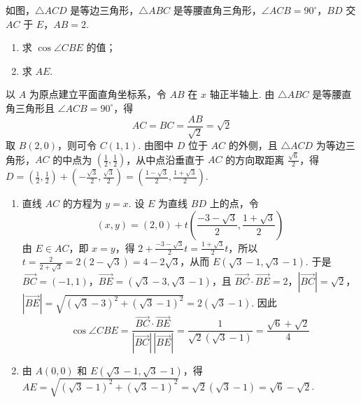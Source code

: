 \begin{problem}
如图，\(\triangle ACD\) 是等边三角形，\(\triangle ABC\) 是等腰直角三角形，\(\angle ACB = 90^{\circ}\)，\(BD\) 交 \(AC\) 于 \(E\)，\(AB = 2\).

\begin{enumerate}
\item 求 \(\cos \angle CBE\) 的值；
\item 求 \(AE\).
\end{enumerate}

\FloatBarrier

\begin{solution}
以 \(A\) 为原点建立平面直角坐标系，令 \(AB\) 在 \(x\) 轴正半轴上. 由 \(\triangle ABC\) 是等腰直角三角形且 \(\angle ACB=90^{\circ}\)，得
\[
AC=BC=\frac{AB}{\sqrt{2}}=\sqrt{2}
\]
取 \(B(2,0)\)，则可令 \(C(1,1)\). 由图中 \(D\) 位于 \(AC\) 的外侧，且 \(\triangle ACD\) 为等边三角形，\(AC\) 的中点为 \(\left(\frac12,\frac12\right)\)，从中点沿垂直于 \(AC\) 的方向取距离 \(\frac{\sqrt{6}}{2}\)，得 \(D=\left(\frac12,\frac12\right)+\left(-\frac{\sqrt{3}}2,\frac{\sqrt{3}}2\right)=\left(\frac{1-\sqrt{3}}2,\frac{1+\sqrt{3}}2\right)\).

\begin{enumerate}
\item 直线 \(AC\) 的方程为 \(y=x\). 设 \(E\) 为直线 \(BD\) 上的点，令
\[
(x,y)=(2,0)+t\left(\frac{-3-\sqrt{3}}{2},\frac{1+\sqrt{3}}{2}\right)
\]
由 \(E\in AC\)，即 \(x=y\)，得 \(2+\frac{-3-\sqrt{3}}2t=\frac{1+\sqrt{3}}2t\)，所以 \(t=\frac{2}{2+\sqrt{3}}=2(2-\sqrt{3})=4-2\sqrt{3}\)，从而 \(E(\sqrt{3}-1,\sqrt{3}-1)\). 于是 \(\overrightarrow{BC}=(-1,1)\)，\(\overrightarrow{BE}=(\sqrt{3}-3,\sqrt{3}-1)\)，且 \(\overrightarrow{BC}\cdot\overrightarrow{BE}=2\)，\(|\overrightarrow{BC}|=\sqrt{2}\)，\(|\overrightarrow{BE}|=\sqrt{(\sqrt{3}-3)^2+(\sqrt{3}-1)^2}=2(\sqrt{3}-1)\).
因此
\[
\cos\angle CBE
=\frac{\overrightarrow{BC}\cdot\overrightarrow{BE}}{|\overrightarrow{BC}|\,|\overrightarrow{BE}|}
=\frac{1}{\sqrt{2}(\sqrt{3}-1)}
=\frac{\sqrt{6}+\sqrt{2}}{4}
\]

\item 由 \(A(0,0)\) 和 \(E(\sqrt{3}-1,\sqrt{3}-1)\)，得 \(AE=\sqrt{(\sqrt{3}-1)^2+(\sqrt{3}-1)^2}=\sqrt{2}(\sqrt{3}-1)=\sqrt{6}-\sqrt{2}\).
\end{enumerate}
\end{solution}
\end{problem}

